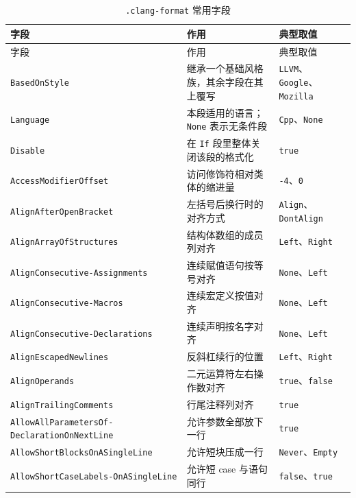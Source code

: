 \documentclass[12pt,a4paper,fontset=fandol]{ctexbook}
\begin{document}
{\footnotesize
\begin{longtable}{@{}>{\raggedright\arraybackslash}p{}
                  >{\raggedright\arraybackslash}p{}
                  >{\raggedright\arraybackslash}p{}@{}}
\caption{\texttt{.clang-format} 常用字段}\label{tab:appA-fmt}\\
\toprule
字段 & 作用 & 典型取值 \\
\midrule
\endfirsthead
\toprule
字段 & 作用 & 典型取值 \\
\midrule
\endhead
\bottomrule
\endlastfoot
\texttt{BasedOnStyle} & 继承一个基础风格族，其余字段在其上覆写 & \texttt{LLVM}、\texttt{Google}、\texttt{Mozilla} \\
\texttt{Language} & 本段适用的语言；\texttt{None} 表示无条件段 & \texttt{Cpp}、\texttt{None} \\
\texttt{Disable} & 在 \texttt{If} 段里整体关闭该段的格式化 & \texttt{true} \\
\texttt{AccessModifierOffset} & 访问修饰符相对类体的缩进量 & \texttt{-4}、\texttt{0} \\
\texttt{AlignAfterOpenBracket} & 左括号后换行时的对齐方式 & \texttt{Align}、\texttt{DontAlign} \\
\texttt{AlignArrayOfStructures} & 结构体数组的成员列对齐 & \texttt{Left}、\texttt{Right} \\
\texttt{AlignConsecutive-\allowbreak Assignments} & 连续赋值语句按等号对齐 & \texttt{None}、\texttt{Left} \\
\texttt{AlignConsecutive-\allowbreak Macros} & 连续宏定义按值对齐 & \texttt{None}、\texttt{Left} \\
\texttt{AlignConsecutive-\allowbreak Declarations} & 连续声明按名字对齐 & \texttt{None}、\texttt{Left} \\
\texttt{AlignEscapedNewlines} & 反斜杠续行的位置 & \texttt{Left}、\texttt{Right} \\
\texttt{AlignOperands} & 二元运算符左右操作数对齐 & \texttt{true}、\texttt{false} \\
\texttt{AlignTrailingComments} & 行尾注释列对齐 & \texttt{true} \\
\texttt{AllowAllParametersOf-\allowbreak DeclarationOnNextLine} & 允许参数全部放下一行 & \texttt{true} \\
\texttt{AllowShortBlocks\allowbreak OnASingleLine} & 允许短块压成一行 & \texttt{Never}、\texttt{Empty} \\
\texttt{AllowShortCaseLabels-\allowbreak OnASingleLine} & 允许短 case 与语句同行 & \texttt{false}、\texttt{true} \\

\end{longtable}}
\end{document}
